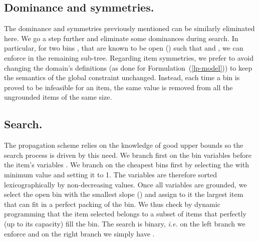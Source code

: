 \subsection{Dominance and symmetries.} The dominance and symmetries previously mentioned can be similarly eliminated here. We go a step further and eliminate some dominances during search. In particular, for two bins ,  that are known to be open ()  such that  and , we can enforce  in the remaining sub-tree. Regarding item symmetries, we prefer to avoid changing the domain's definitions (as done for Formulation~(\ref{lp-model})) to keep the semantics of the global constraint unchanged. Instead, each time a bin is proved to be infeasible for an item, the same value is removed from all the ungrounded items of the same size.
 
\subsection{Search.} The propagation scheme relies on the knowledge of good upper bounds so the search process is driven by this need. We branch first on the bin variables  before the item's variables . We branch on the cheapest bins first by selecting the  with minimum  value and setting it to 1. The  variables are therefore sorted lexicographically by non-decreasing  values. Once all  variables are grounded, we select the open bin  with the smallest slope () and assign to it the largest item that can fit in a perfect packing of the bin. We thus check by dynamic programming that the item selected belongs to a subset of items that perfectly (up to its capacity) fill the bin. The search is binary, \emph{i.e.} on the left branch we enforce  and on the right branch we simply have .

